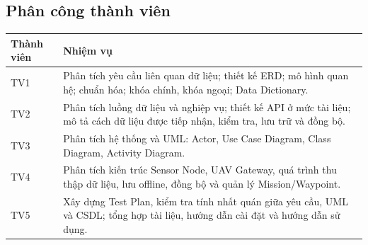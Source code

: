 
\subsection{Phân công thành viên}
\begin{longtable}{p{}p{}}
\toprule
\textbf{Thành viên} & \textbf{Nhiệm vụ} \\
\midrule
TV1 & Phân tích yêu cầu liên quan dữ liệu; thiết kế ERD; mô hình quan hệ; chuẩn hóa; khóa chính, khóa ngoại; Data Dictionary. \\
TV2 & Phân tích luồng dữ liệu và nghiệp vụ; thiết kế API ở mức tài liệu; mô tả cách dữ liệu được tiếp nhận, kiểm tra, lưu trữ và đồng bộ. \\
TV3 & Phân tích hệ thống và UML: Actor, Use Case Diagram, Class Diagram, Activity Diagram. \\
TV4 & Phân tích kiến trúc Sensor Node, UAV Gateway, quá trình thu thập dữ liệu, lưu offline, đồng bộ và quản lý Mission/Waypoint. \\
TV5 & Xây dựng Test Plan, kiểm tra tính nhất quán giữa yêu cầu, UML và CSDL; tổng hợp tài liệu, hướng dẫn cài đặt và hướng dẫn sử dụng. \\
\bottomrule
\end{longtable}

